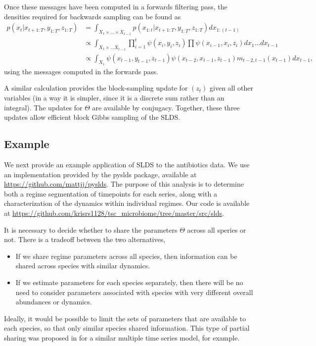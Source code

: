 \documentclass[14pt]{extreport}
\begin{document}
Once these messages have been computed in a forwards filtering pass, the
densities required for backwards sampling can be found as
\begin{align*}
  p\left(x_t \vert x_{t + 1:T}, y_{1:T}, z_{1:T}\right) &=
  \int_{X_1 \times \dots \times X_{t - 1}} p\left(x_{1:t} \vert x_{t + 1: T}, y_{1:T}, z_{1:T}\right) dx_{1:(t - 1)} \\
  &\propto \int_{X_1 \times \dots X_{t - 1}} \prod_{i = 1}^{t} \psi\left(x_i, y_i, z_i\right) \prod \psi\left(x_{i - 1}, x_i, z_i\right) dx_{1} \dots dx_{t - 1} \\
  &\propto \int_{X_{1}} \psi\left(x_{t - 1}, y_{t - 1}, z_{t - 1}\right)\psi\left(x_{t - 2}, x_{t - 1}, z_{t - 1}\right) m_{t - 2, t - 1}\left(x_{t - 1}\right) d x_{t - 1},
\end{align*}
using the messages computed in the forwards pass.

A similar calculation provides the block-sampling update for
$\left(z_{t}\right)$ given all other variables (in a way it is simpler, since it
is a discrete sum rather than an integral). The updates for $\Theta$ are
available by conjugacy. Together, these three updates allow efficient block
Gibbs sampling of the SLDS.

\subsection{Example}
\label{subsec:slds_example}

We next provide an example application of SLDS to the antibiotics data. We use
an implementation provided by the pyslds package, available at
\url{https://github.com/mattjj/pyslds}. The purpose of this analysis is to
determine both a regime segmentation of timepoints for each series, along with a
characterization of the dynamics within individual regimes. Our code is
available at
\url{https://github.com/krisrs1128/tsc_microbiome/tree/master/src/slds}.

It is necessary to decide whether to share the parameters $\Theta$ across all
speries or not. There is a tradeoff between the two alternatives,
\begin{itemize}
\item If we share regime parameters across all species, then information can be
  shared across species with similar dynamics.
\item If we estimate parameters for each species separately, then there will be
  no need to consider parameters associated with species with very different
  overall abundances or dynamics.
\end{itemize}
Ideally, it would be possible to limit the sets of parameters that are available
to each species, so that only similar species shared information. This type of
partial sharing was proposed in \citep{fox2009sharing} for a similar multiple
time series model, for example.
\end{document}
